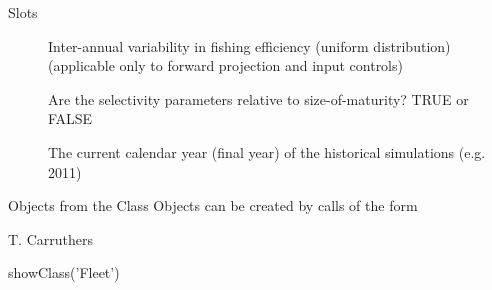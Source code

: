 \documentclass[a4paper]{book}
\begin{document}
\begin{Section}{Slots}
\begin{description}
\item[] Inter-annual variability in fishing efficiency (uniform distribution)(applicable only to forward projection and input controls)

\item[] Are the selectivity parameters relative to size-of-maturity? TRUE or FALSE

\item[] The current calendar year (final year) of the historical simulations (e.g. 2011)

\end{description}
\end{Section}
%
\begin{Section}{Objects from the Class}
Objects can be created by calls of the form
\end{Section}
%
\begin{Author}\relax
T. Carruthers
\end{Author}
%
\begin{Examples}
\begin{ExampleCode}

showClass('Fleet')

\end{ExampleCode}
\end{Examples}
\end{document}
